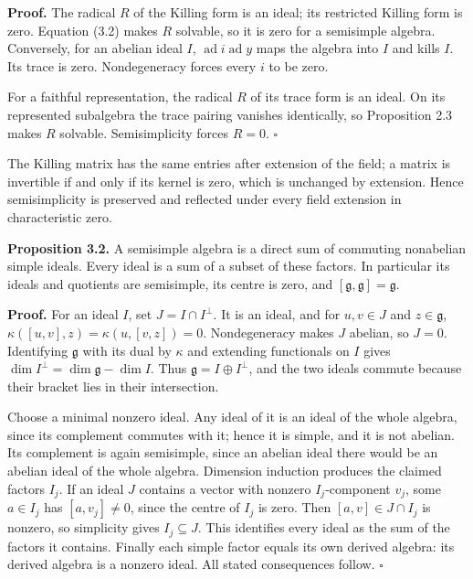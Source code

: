 \documentclass[11pt,a4paper,openany]{report}
\begin{document}
\textbf{Proof.} The radical \(R\) of the Killing form is an ideal; its restricted Killing form is zero. Equation (3.2) makes \(R\) solvable, so it is zero for a semisimple algebra. Conversely, for an abelian ideal \(I\), \(\operatorname{ad}i\operatorname{ad}y\) maps the algebra into \(I\) and kills \(I\). Its trace is zero. Nondegeneracy forces every \(i\) to be zero.

For a faithful representation, the radical \(R\) of its trace form is an ideal. On its represented subalgebra the trace pairing vanishes identically, so Proposition 2.3 makes \(R\) solvable. Semisimplicity forces \(R=0\). \(\square\)

The Killing matrix has the same entries after extension of the field; a matrix is invertible if and only if its kernel is zero, which is unchanged by extension. Hence semisimplicity is preserved and reflected under every field extension in characteristic zero.

\textbf{Proposition 3.2.} A semisimple algebra is a direct sum of commuting nonabelian simple ideals. Every ideal is a sum of a subset of these factors. In particular its ideals and quotients are semisimple, its centre is zero, and \([\mathfrak g,\mathfrak g]=\mathfrak g\).

\textbf{Proof.} For an ideal \(I\), set \(J=I\cap I^\perp\). It is an ideal, and for \(u,v\in J\) and \(z\in\mathfrak g\), \(\kappa([u,v],z)=\kappa(u,[v,z])=0\). Nondegeneracy makes \(J\) abelian, so \(J=0\). Identifying \(\mathfrak g\) with its dual by \(\kappa\) and extending functionals on \(I\) gives \(\dim I^\perp=\dim\mathfrak g-\dim I\). Thus \(\mathfrak g=I\oplus I^\perp\), and the two ideals commute because their bracket lies in their intersection.

Choose a minimal nonzero ideal. Any ideal of it is an ideal of the whole algebra, since its complement commutes with it; hence it is simple, and it is not abelian. Its complement is again semisimple, since an abelian ideal there would be an abelian ideal of the whole algebra. Dimension induction produces the claimed factors \(I_j\). If an ideal \(J\) contains a vector with nonzero \(I_j\)-component \(v_j\), some \(a\in I_j\) has \([a,v_j]\ne0\), since the centre of \(I_j\) is zero. Then \([a,v]\in J\cap I_j\) is nonzero, so simplicity gives \(I_j\subseteq J\). This identifies every ideal as the sum of the factors it contains. Finally each simple factor equals its own derived algebra: its derived algebra is a nonzero ideal. All stated consequences follow. \(\square\)
\end{document}
